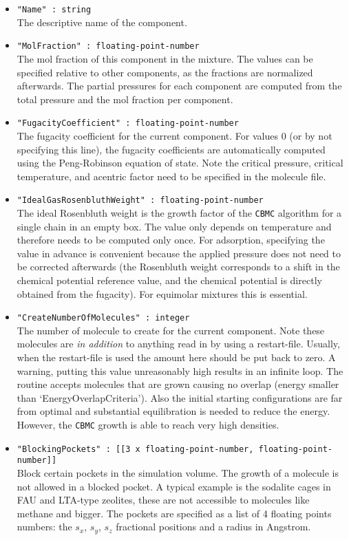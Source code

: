 \begin{itemize}
\item{\verb+"Name" : string+}\\
The descriptive name of the component.
\item{\verb+"MolFraction" : floating-point-number+}\\
The mol fraction of this component in the mixture. The values can be specified relative to other components, as the fractions are normalized afterwards.
The partial pressures for each component are computed from the total pressure and the mol fraction per component.
\item{\verb+"FugacityCoefficient" : floating-point-number+}\\
The fugacity coefficient for the current component. For values 0 (or by not specifying this line), the fugacity coefficients are automatically computed using the Peng-Robinson
equation of state. Note the critical pressure, critical temperature, and acentric factor need to be specified in the molecule file.
\item{\verb+"IdealGasRosenbluthWeight" : floating-point-number+}\\
  The ideal Rosenbluth weight is the growth factor of the \texttt{CBMC} algorithm for a single chain in an empty box. The value only depends on temperature and therefore needs to be computed
only once. For adsorption, specifying the value in advance is convenient because the applied pressure does not need to be corrected afterwards (the Rosenbluth weight corresponds to a shift
in the chemical potential reference value, and the chemical potential is directly obtained from the fugacity). For equimolar mixtures this is essential.
\item{\verb+"CreateNumberOfMolecules" : integer+}\\
The number of molecule to create for the current component. 
Note these molecules are \emph{in addition} to anything read in by using a restart-file. Usually, when the restart-file
is used the amount here should be put back to zero. A warning, putting this value unreasonably high results in an infinite loop. 
The routine accepts molecules that are grown causing no overlap (energy smaller than `EnergyOverlapCriteria'). 
Also the initial starting configurations are far from optimal and substantial equilibration is needed to reduce the energy.
    However, the \texttt{CBMC} growth is able to reach very high densities.
\item{\verb+"BlockingPockets" : [[3 x floating-point-number, floating-point-number]]+}\\
Block certain pockets in the simulation volume. The growth of a molecule is not allowed in a blocked pocket. 
A typical example is the sodalite cages in FAU and LTA-type zeolites,
these are not accessible to molecules like methane and bigger.
The pockets are specified as a list of 4 floating points numbers: the $s_x$, $s_y$, $s_z$ fractional positions and 
a radius in Angstrom.


\end{itemize}
